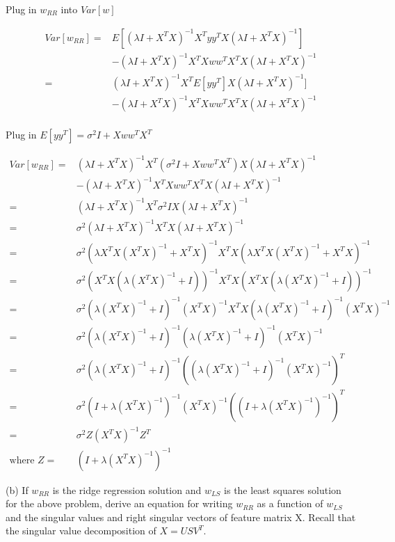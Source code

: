 \documentclass[11pt]{report}
\begin{document}
\justify
Plug in $w_{RR}$ into $Var[w]$

\begin{equation*}
\begin{split}
Var[w_{RR}] =  & E[(\lambda I + X^TX)^{-1}X^Ty  y^T X (\lambda I + X^TX)^{-1}] \\
& - (\lambda I + X^TX)^{-1}X^TXw w^T X^T X (\lambda I + X^TX)^{-1}\\
= &(\lambda I + X^TX)^{-1}X^T E[y y^T] X (\lambda I + X^TX)^{-1}] \\
& - (\lambda I + X^TX)^{-1}X^TXw w^T X^T X (\lambda I + X^TX)^{-1}\\
\end{split} 
\end{equation*}

\justify
Plug in $E[yy^T] = \sigma^2I + Xww^TX^T$

\begin{equation*}
\begin{split}
Var[w_{RR}] = &(\lambda I + X^TX)^{-1}X^T (\sigma^2I + Xww^TX^T) X (\lambda I + X^TX)^{-1} \\
& - (\lambda I + X^TX)^{-1}X^TXw w^T X^T X (\lambda I + X^TX)^{-1}\\
= &(\lambda I + X^TX)^{-1}X^T \sigma^2I X (\lambda I + X^TX)^{-1}  \\
= &\sigma^2 (\lambda I + X^TX)^{-1}X^T X (\lambda I + X^TX)^{-1}  \\
= &\sigma^2 (\lambda X^TX(X^TX)^{-1} + X^TX)^{-1}X^T X(\lambda X^TX(X^TX)^{-1} + X^TX)^{-1}  \\
= &\sigma^2 (X^TX(\lambda (X^TX)^{-1} + I))^{-1}X^T X (X^TX(\lambda (X^TX)^{-1} + I))^{-1}  \\
= &\sigma^2 (\lambda (X^TX)^{-1} + I)^{-1} (X^TX)^{-1} X^T X (\lambda (X^TX)^{-1} + I)^{-1} (X^TX)^{-1} \\
= &\sigma^2 (\lambda (X^TX)^{-1} + I)^{-1} (\lambda (X^TX)^{-1} + I)^{-1} (X^TX)^{-1} \\
= &\sigma^2 (\lambda (X^TX)^{-1} + I)^{-1} ((\lambda (X^TX)^{-1} + I)^{-1} (X^TX)^{-1})^T \\
= &\sigma^2 (I + \lambda(X^TX)^{-1})^{-1}  (X^TX)^{-1} ((I + \lambda(X^TX)^{-1})^{-1})^T \\
= &\sigma^2 Z (X^TX)^{-1} Z^T \\
\text{where } Z = &(I + \lambda (X^TX)^{-1})^{-1}
\end{split} 
\end{equation*}

\pagebreak

\justify
(b) If $w_{RR}$ is the ridge regression solution and $w_{LS}$ is the least squares solution for the above problem,
derive an equation for writing $w_{RR}$ as a function of $w_{LS}$ and the singular values and right singular vectors
of feature matrix X. Recall that the singular value decomposition of $X = USV^T$.
\end{document}
